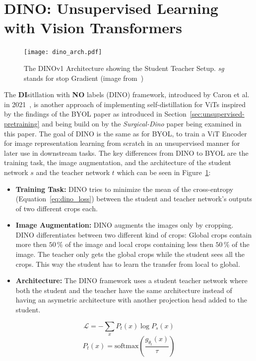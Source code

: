 \section{DINO: Unsupervised Learning with Vision Transformers}\label{sec:dino}
\begin{figure}
    \centering
    \texttt{[image: dino\_arch.pdf]}
    \caption[The DINOv1 Architecture]{The DINOv1 Architecture showing the Student Teacher Setup. \emph{sg} stands for stop Gradient (image from~\cite{Caron2021})}\label{fig:dinov1}
\end{figure}
The \textbf{DI}sitllation with \textbf{NO} labels (DINO) framework, introduced by Caron et al. in 2021~\cite{Caron2021}, is another approach of implementing self-distillation for ViTs inspired by the findings of the BYOL paper as introduced in Section~\ref{sec:unsupervised-pretraining} and being build on by the \emph{Surgical-Dino} paper being examined in this paper.
The goal of DINO is the same as for BYOL, to train a ViT Encoder for image representation learning from scratch in an unsupervised manner for later use in downstream tasks.
The key differences from DINO to BYOL are the training task, the image augmentation, and the architecture of the student network $s$ and the teacher network $t$ which can be seen in Figure~\ref{fig:dinov1}:
\begin{itemize}
    \item \textbf{Training Task:} DINO tries to minimize the mean of the cross-entropy (Equation~\ref{eq:dino_loss}) between the student and teacher network's outputs of two different crops each.
    \item \textbf{Image Augmentation:} DINO augments the images only by cropping. DINO differentiates between two different kind of crops: Global crops contain more then $50\,\%$ of the image and local crops containing less then $50\,\%$ of the image. The teacher only gets the global crops while the student sees all the crops. This way the student has to learn the transfer from local to global.
    \item \textbf{Architecture:} The DINO framework uses a student teacher network where both the student and the teacher have the same architecture instead of having an asymetric architecture with another projection head added to the student.
\end{itemize}

\begin{equation}
    \mathcal{L} = -\sum_{x} P_{t}(x) \log P_{s}(x)
    \label{eq:dino_loss}
\end{equation}
\begin{equation}
    P_{t}(x) = \text{softmax}\left(\frac{g_{\theta_t}(x)}{\tau}\right)
    \label{eq:softmax}
\end{equation}

